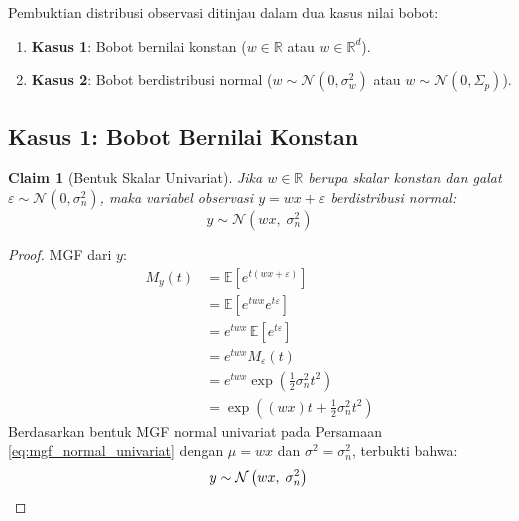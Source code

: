 \documentclass[11pt,a4paper]{article}
\def\mathbf#1{#1}%
\theoremstyle{plain}
\newtheorem{claim}{Claim}[section]
\theoremstyle{definition}
\theoremstyle{remark}
\begin{document}
Pembuktian distribusi observasi ditinjau dalam dua kasus nilai bobot:
\begin{enumerate}
    \item \textbf{Kasus 1}: Bobot bernilai konstan ($w \in \mathbb{R}$ atau $\mathbf{w} \in \mathbb{R}^d$).
    \item \textbf{Kasus 2}: Bobot berdistribusi normal ($w \sim \mathcal{N}(0, \sigma_w^2)$ atau $\mathbf{w} \sim \mathcal{N}(\mathbf{0}, \Sigma_p)$).
\end{enumerate}

\subsection{Kasus 1: Bobot Bernilai Konstan}
\label{subsec:kasus_1}

\begin{claim}[Bentuk Skalar Univariat]
Jika $w \in \mathbb{R}$ berupa skalar konstan dan galat $\varepsilon \sim \mathcal{N}(0, \sigma_n^2)$, maka variabel observasi $y = wx + \varepsilon$ berdistribusi normal:
\begin{equation}
y \sim \mathcal{N}\left( wx, \; \sigma_n^2 \right)
\end{equation}
\end{claim}

\begin{proof}
MGF dari $y$:
\begin{align}
M_y(t) &= \mathbb{E}\left[ e^{t(wx + \varepsilon)} \right] \nonumber \\
&= \mathbb{E}\left[ e^{twx} e^{t\varepsilon} \right] \nonumber \\
&= e^{twx} \, \mathbb{E}\left[ e^{t\varepsilon} \right] \nonumber \\
&= e^{twx} M_\varepsilon(t) \nonumber \\
&= e^{twx} \exp\left( \frac{1}{2}\sigma_n^2 t^2 \right) \nonumber \\
&= \exp\left( (wx)t + \frac{1}{2}\sigma_n^2 t^2 \right) \label{eq:mgf_y_kasus1}
\end{align}
Berdasarkan bentuk MGF normal univariat pada Persamaan \eqref{eq:mgf_normal_univariat} dengan $\mu = wx$ dan $\sigma^2 = \sigma_n^2$, terbukti bahwa:
\begin{equation}
y \sim \mathcal{N}\left( wx, \; \sigma_n^2 \right) \qedhere
\end{equation}
\end{proof}
\end{document}

